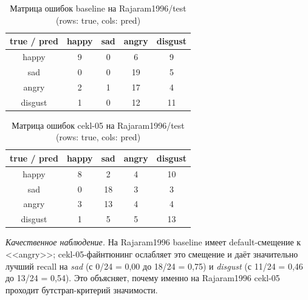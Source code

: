 \documentclass[a4paper, 12pt, oneside, openany]{article}
\begin{document}
\begin{table}[H]
\caption{Матрица ошибок baseline на Rajaram1996/test (rows: true, cols: pred)}
\label{tab:cm_baseline_raja}
\centering
\small
\begin{tabular}{|c|c|c|c|c|}
\hline
true / pred & happy & sad & angry & disgust \\
\hline
happy & 9 & 0 & 6 & 9 \\
\hline
sad & 0 & 0 & 19 & 5 \\
\hline
angry & 2 & 1 & 17 & 4 \\
\hline
disgust & 1 & 0 & 12 & 11 \\
\hline
\end{tabular}
\end{table}

\begin{table}[H]
\caption{Матрица ошибок cekl-05 на Rajaram1996/test (rows: true, cols: pred)}
\label{tab:cm_cekl05_raja}
\centering
\small
\begin{tabular}{|c|c|c|c|c|}
\hline
true / pred & happy & sad & angry & disgust \\
\hline
happy & 8 & 2 & 4 & 10 \\
\hline
sad & 0 & 18 & 3 & 3 \\
\hline
angry & 3 & 13 & 4 & 4 \\
\hline
disgust & 1 & 5 & 5 & 13 \\
\hline
\end{tabular}
\end{table}

\textit{Качественное наблюдение.} На Rajaram1996 baseline имеет default-смещение к <<angry>>; cekl-05-файнтюнинг ослабляет это смещение и даёт значительно лучший recall на \textit{sad} (с 0/24 = 0,00 до 18/24 = 0,75) и \textit{disgust} (с 11/24 = 0,46 до 13/24 = 0,54). Это объясняет, почему именно на Rajaram1996 cekl-05 проходит бутстрап-критерий значимости.

\newpage
\section{\centering}\label{PrilE}
\begin{center}
\end{center}
\setcounter{equation}{0}
\renewcommand{\theequation}{\Asbuk{section}.\arabic{equation}}
\setcounter{table}{0}
\renewcommand{\thetable}{\Asbuk{section}.\arabic{table}}
\setcounter{figure}{0}
\renewcommand{\thefigure}{\Asbuk{section}.\arabic{figure}}
\end{document}
